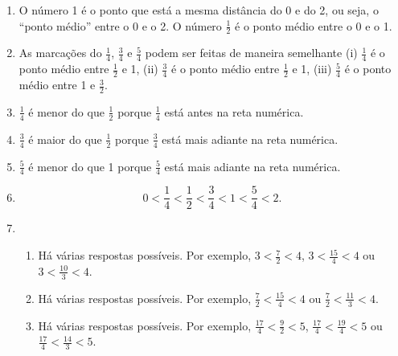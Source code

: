\documentclass[10 pt,usenames,dvipsnames, oneside]{article}
\begin{document}
\ifdefined\prof
\begin{solucao}

\begin{center}
\end{center}


\begin{enumerate}
    \item      O número 1 é o ponto que está a mesma distância do 0 e do 2, ou seja, o ``ponto médio'' entre o 0 e o 2. O número $\frac{1}{2}$ é o ponto médio entre o 0 e o 1.

\item  As marcações do $\frac{1}{4}$, $\frac{3}{4}$ e $\frac{5}{4}$ podem ser feitas de maneira semelhante (i) $\frac{1}{4}$ é o ponto médio entre $\frac{1}{2}$ e 1, (ii) $\frac{3}{4}$ é o ponto médio entre $\frac{1}{2}$ e 1, (iii) $\frac{5}{4}$ é o ponto médio entre 1 e $\frac{3}{2}$.
    \item       $\frac{1}{4}$       é menor do que       $\frac{1}{2}$       porque $\frac{1}{4}$ está antes na reta numérica.
    \item       $\frac{3}{4}$       é maior do que        $\frac{1}{2}$       porque $\frac{3}{4}$ está mais adiante na reta numérica.
    \item       $\frac{5}{4}$       é menor do que 1 porque $\frac{5}{4}$ está mais adiante na reta numérica.
    \item       $$0 < \frac{1}{4} < \frac{1}{2}< \frac{3}{4} < 1 < \frac{5}{4} < 2.$$
    \item \mbox{ }
      
      \begin{enumerate}[label=\Alph*)]
    \item Há várias respostas possíveis. Por exemplo,       $3 < \frac{7}{2} < 4$,       $3 < \frac{15}{4} < 4$         ou         $3 < \frac{10}{3} < 4$.
    \item       Há várias respostas possíveis. Por exemplo,       $\frac{7}{2} < \frac{15}{4} < 4$ ou $\frac{7}{2} < \frac{11}{3} < 4$.
    \item       Há várias respostas possíveis. Por exemplo,       $\frac{17}{4} < \frac{9}{2} < 5$, $\frac{17}{4} < \frac{19}{4} < 5$ ou $\frac{17}{4} < \frac{14}{3} < 5$.
      \end{enumerate}
     
\end{enumerate} %

\end{solucao}
\fi
\end{document}
